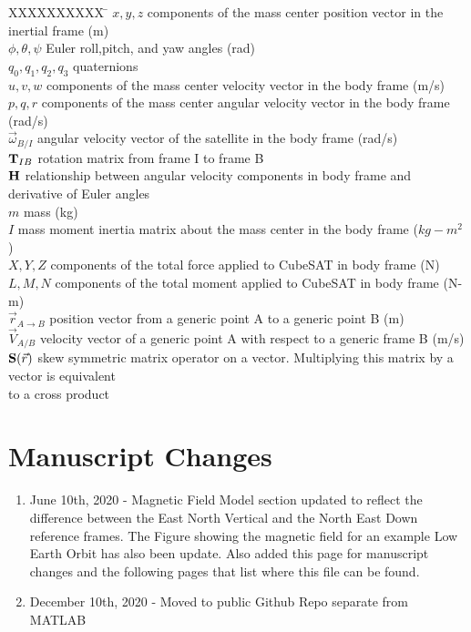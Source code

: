 \documentclass{article}
\begin{document}
\begin{tabbing}
  XXXXXXXXXX \= \kill%
  $x,y,z$ \> components of the mass center position vector in the
  inertial frame (m)  \\
  $\phi,\theta,\psi$ \> Euler roll,pitch, and yaw angles (rad) \\
  $q_0,q_1,q_2,q_3$ \>  quaternions \\  
  $u,v,w$ \> components of the mass center velocity vector in the
  body frame (m/s)  \\
  $p,q,r$ \> components of the mass center angular velocity vector in the
  body frame (rad/s)  \\
  $\vec{\omega}_{B/I}$ \> angular velocity vector of the satellite in
  the body frame (rad/s) \\
  ${\bf T}_{IB}$ \> rotation matrix from frame I to frame B \\
  ${\bf H}$ \> relationship between angular velocity components in
  body frame and derivative of Euler angles \\
  $m$ \> mass (kg) \\
  $I$ \> mass moment inertia matrix about the mass center
  in the body frame ($kg-m^2$)  \\
  $X,Y,Z$ \> components of the total force applied to CubeSAT in
  body frame (N)  \\
  $L,M,N$ \> components of the total moment applied to CubeSAT in
  body frame (N-m)  \\
  ${\vec r}_{A\rightarrow B}$ \> position vector from a generic point A
  to a generic point B (m) \\
  ${\vec V}_{A/B}$ \> velocity vector of a generic point A
  with respect to a generic frame B (m/s) \\
  ${\bf S}(\vec{r})$ \> skew symmetric matrix operator on a
  vector. Multiplying this matrix by a vector is equivalent \\
  \> to a cross product\\
\end{tabbing}

\newpage

\section*{Manuscript Changes}

\begin{enumerate}[itemsep=-5pt]
\item June 10th, 2020 - Magnetic Field Model section updated to
  reflect the difference between the East North Vertical and the North
  East Down reference frames. The Figure showing the magnetic field
  for an example Low Earth Orbit has also been update. Also added this
  page for manuscript changes and the following pages that list where
  this file can be found.
\item December 10th, 2020 - Moved to public Github Repo separate from MATLAB
\end{enumerate}
\end{document}
